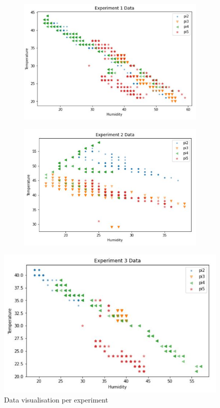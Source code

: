 \documentclass{mprop}
\begin{document}
\begin{figure}
    \begin{subfigure}{0.5\textwidth}
      \includegraphics[width=1\linewidth]{mprop/exp1.JPG}
      \label{fig:sfig2}
    \end{subfigure}
    \begin{subfigure}{0.5\textwidth}
      \includegraphics[width=1\linewidth]{mprop/exp2.JPG}
      \label{fig:sfig2}
    \end{subfigure}
\end{figure}

\setcounter{figure}{0}
\begin{figure}
    \centering
    \includegraphics[width=0.5\linewidth]{mprop/exp3.JPG}
    \caption{Data visualisation per experiment}
    \label{fig:Data Visualisation}
\end{figure}
\end{document}

